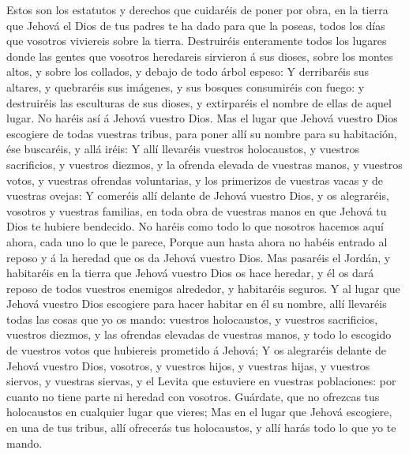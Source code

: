  Estos son los estatutos y derechos que cuidaréis de poner
por obra, en la tierra que Jehová el Dios de tus padres te ha dado para
que la poseas, todos los días que vosotros viviereis sobre la tierra.
 Destruiréis enteramente todos los lugares donde las
gentes que vosotros heredareis sirvieron á sus dioses, sobre los montes
altos, y sobre los collados, y debajo de todo árbol espeso:
 Y derribaréis sus altares, y quebraréis sus imágenes, y
sus bosques consumiréis con fuego: y destruiréis las esculturas de sus
dioses, y extirparéis el nombre de ellas de aquel lugar. 
No haréis así á Jehová vuestro Dios.  Mas el lugar que
Jehová vuestro Dios escogiere de todas vuestras tribus, para poner allí
su nombre para su habitación, ése buscaréis, y allá iréis:
 Y allí llevaréis vuestros holocaustos, y vuestros
sacrificios, y vuestros diezmos, y la ofrenda elevada de vuestras manos,
y vuestros votos, y vuestras ofrendas voluntarias, y los primerizos de
vuestras vacas y de vuestras ovejas:  Y comeréis allí
delante de Jehová vuestro Dios, y os alegraréis, vosotros y vuestras
familias, en toda obra de vuestras manos en que Jehová tu Dios te
hubiere bendecido.  No haréis como todo lo que nosotros
hacemos aquí ahora, cada uno lo que le parece,  Porque aun
hasta ahora no habéis entrado al reposo y á la heredad que os da Jehová
vuestro Dios.  Mas pasaréis el Jordán, y habitaréis en la
tierra que Jehová vuestro Dios os hace heredar, y él os dará reposo de
todos vuestros enemigos alrededor, y habitaréis seguros. 
Y al lugar que Jehová vuestro Dios escogiere para hacer habitar en él su
nombre, allí llevaréis todas las cosas que yo os mando: vuestros
holocaustos, y vuestros sacrificios, vuestros diezmos, y las ofrendas
elevadas de vuestras manos, y todo lo escogido de vuestros votos que
hubiereis prometido á Jehová;  Y os alegraréis delante de
Jehová vuestro Dios, vosotros, y vuestros hijos, y vuestras hijas, y
vuestros siervos, y vuestras siervas, y el Levita que estuviere en
vuestras poblaciones: por cuanto no tiene parte ni heredad con vosotros.
 Guárdate, que no ofrezcas tus holocaustos en cualquier
lugar que vieres;  Mas en el lugar que Jehová escogiere,
en una de tus tribus, allí ofrecerás tus holocaustos, y allí harás todo
lo que yo te mando.

